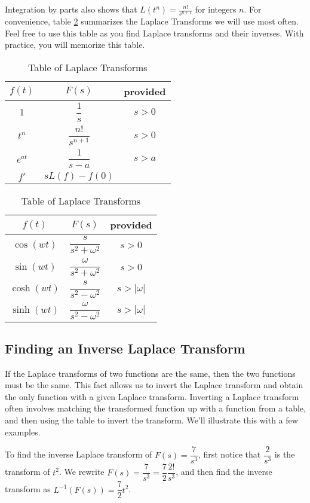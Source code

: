 Integration by parts also shows that $L(t^n) = \frac{n!}{s^{n+1}}$ for integers $n$. 
For convenience, table \ref{laplacetable} summarizes the Laplace Transforms we will use most often. Feel free to use this table as you find Laplace transforms and their inverses.  With practice, you will memorize this table.
\begin{table}
\begin{center}
\begin{tabular}[t]{|c|cc|}
\hline
$f(t)$ & $F(s)$ & provided\\
\hline\hline
$1$					&$\dfrac{1}{s}$ 							&$s>0$\\\hline
$t^n$				&$\dfrac{n!}{s^{n+1}}$ 			&$s>0$\\\hline
$e^{at}$		&$\dfrac{1}{s-a}$ 			&$s>a$\\\hline
$f'$					&$sL(f)-f(0)$ 						&\\\hline
\end{tabular}
\quad
\begin{tabular}[t]{|c|cc|}
\hline
$f(t)$ & $F(s)$ & provided\\
\hline\hline
$\cos(wt)$  &$\dfrac{s}{s^2+\omega^2}$ 			&$s>0$\\\hline
$\sin(wt)$  &$\dfrac{\omega}{s^2+\omega^2}$ 			&$s>0$\\\hline
$\cosh(wt)$ &$\dfrac{s}{s^2-\omega^2}$ 			&$s>|\omega|$\\\hline
$\sinh(wt)$ &$\dfrac{\omega}{s^2-\omega^2}$ 			&$s>|\omega|$\\\hline
\end{tabular}

\caption{Table of Laplace Transforms}
\label{laplacetable}
\end{center}
\end{table}


\subsection{Finding an Inverse Laplace Transform}
If the Laplace transforms of two functions are the same, then the two functions must be the same. This fact allows us to invert the Laplace transform and obtain the only function with a given Laplace transform.  Inverting a Laplace transform often involves matching the transformed function up with a function from a table, and then using the table to invert the transform.  We'll illustrate this with a few examples.

\begin{example}
To find the inverse Laplace transform of $F(s) = \dfrac{7}{s^3}$, first notice that $\dfrac{2}{s^3}$ is the transform of $t^2$. We rewrite $F(s) = \dfrac{7}{s^3} = \dfrac{7}{2}\dfrac{2!}{s^3}$, and then find the inverse transform as $L^{-1}(F(s)) = \dfrac{7}{2}t^2$.
\end{example}

